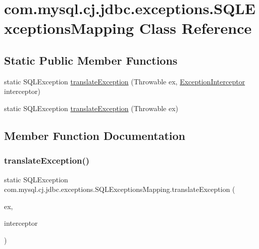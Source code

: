 \hypertarget{classcom_1_1mysql_1_1cj_1_1jdbc_1_1exceptions_1_1_s_q_l_exceptions_mapping}{}\section{com.\+mysql.\+cj.\+jdbc.\+exceptions.\+S\+Q\+L\+Exceptions\+Mapping Class Reference}
\label{classcom_1_1mysql_1_1cj_1_1jdbc_1_1exceptions_1_1_s_q_l_exceptions_mapping}
\subsection*{Static Public Member Functions}
\begin{DoxyCompactItemize}
\item 
static S\+Q\+L\+Exception \mbox{\hyperlink{classcom_1_1mysql_1_1cj_1_1jdbc_1_1exceptions_1_1_s_q_l_exceptions_mapping_a65c84da3d2ddfcbb8c22ce4c86ff1dc3}{translate\+Exception}} (Throwable ex, \mbox{\hyperlink{interfacecom_1_1mysql_1_1cj_1_1exceptions_1_1_exception_interceptor}{Exception\+Interceptor}} interceptor)
\item 
static S\+Q\+L\+Exception \mbox{\hyperlink{classcom_1_1mysql_1_1cj_1_1jdbc_1_1exceptions_1_1_s_q_l_exceptions_mapping_ac678ac3e495c6fd3cc53982eb2afb138}{translate\+Exception}} (Throwable ex)
\end{DoxyCompactItemize}


\subsection{Member Function Documentation}
\mbox{\label{classcom_1_1mysql_1_1cj_1_1jdbc_1_1exceptions_1_1_s_q_l_exceptions_mapping_a65c84da3d2ddfcbb8c22ce4c86ff1dc3}} 
\subsubsection{\texorpdfstring{translate\+Exception()}{translateException()}\hspace{0.1cm}{\footnotesize\ttfamily [1/2]}}
{\footnotesize\ttfamily static S\+Q\+L\+Exception com.\+mysql.\+cj.\+jdbc.\+exceptions.\+S\+Q\+L\+Exceptions\+Mapping.\+translate\+Exception (\begin{DoxyParamCaption}\item[{Throwable}]{ex,  }\item[{\mbox{\hyperlink{interfacecom_1_1mysql_1_1cj_1_1exceptions_1_1_exception_interceptor}{Exception\+Interceptor}}}]{interceptor }\end{DoxyParamCaption})\hspace{0.3cm}{\ttfamily [static]}}

